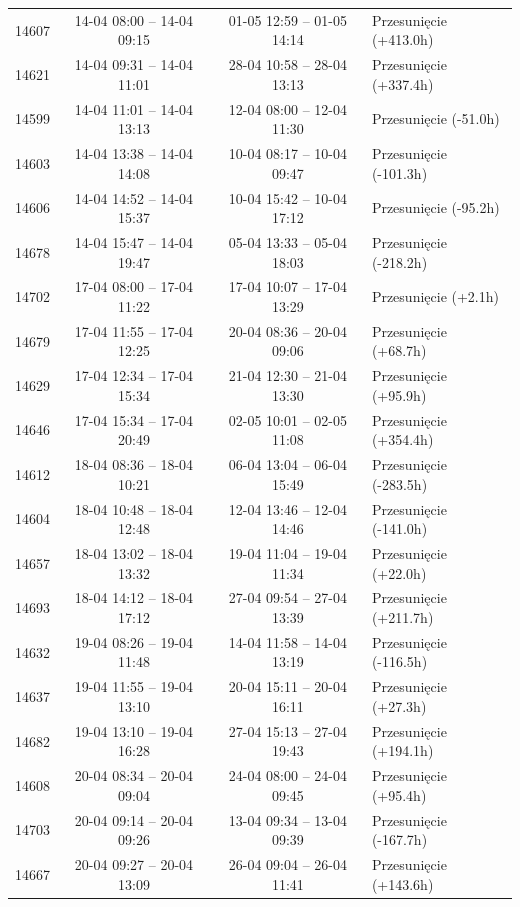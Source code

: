 \begin{table}[htbp]
\begin{tabular}{|r|c|c|l|}
14607 & 14-04 08:00 -- 14-04 09:15 & 01-05 12:59 -- 01-05 14:14 & Przesunięcie (+413.0h) \\ 
14621 & 14-04 09:31 -- 14-04 11:01 & 28-04 10:58 -- 28-04 13:13 & Przesunięcie (+337.4h) \\ 
14599 & 14-04 11:01 -- 14-04 13:13 & 12-04 08:00 -- 12-04 11:30 & Przesunięcie (-51.0h) \\ 
14603 & 14-04 13:38 -- 14-04 14:08 & 10-04 08:17 -- 10-04 09:47 & Przesunięcie (-101.3h) \\ 
14606 & 14-04 14:52 -- 14-04 15:37 & 10-04 15:42 -- 10-04 17:12 & Przesunięcie (-95.2h) \\ 
14678 & 14-04 15:47 -- 14-04 19:47 & 05-04 13:33 -- 05-04 18:03 & Przesunięcie (-218.2h) \\ 
14702 & 17-04 08:00 -- 17-04 11:22 & 17-04 10:07 -- 17-04 13:29 & Przesunięcie (+2.1h) \\ 
14679 & 17-04 11:55 -- 17-04 12:25 & 20-04 08:36 -- 20-04 09:06 & Przesunięcie (+68.7h) \\ 
14629 & 17-04 12:34 -- 17-04 15:34 & 21-04 12:30 -- 21-04 13:30 & Przesunięcie (+95.9h) \\ 
14646 & 17-04 15:34 -- 17-04 20:49 & 02-05 10:01 -- 02-05 11:08 & Przesunięcie (+354.4h) \\ 
14612 & 18-04 08:36 -- 18-04 10:21 & 06-04 13:04 -- 06-04 15:49 & Przesunięcie (-283.5h) \\ 
14604 & 18-04 10:48 -- 18-04 12:48 & 12-04 13:46 -- 12-04 14:46 & Przesunięcie (-141.0h) \\ 
14657 & 18-04 13:02 -- 18-04 13:32 & 19-04 11:04 -- 19-04 11:34 & Przesunięcie (+22.0h) \\ 
14693 & 18-04 14:12 -- 18-04 17:12 & 27-04 09:54 -- 27-04 13:39 & Przesunięcie (+211.7h) \\ 
14632 & 19-04 08:26 -- 19-04 11:48 & 14-04 11:58 -- 14-04 13:19 & Przesunięcie (-116.5h) \\ 
14637 & 19-04 11:55 -- 19-04 13:10 & 20-04 15:11 -- 20-04 16:11 & Przesunięcie (+27.3h) \\ 
14682 & 19-04 13:10 -- 19-04 16:28 & 27-04 15:13 -- 27-04 19:43 & Przesunięcie (+194.1h) \\ 
14608 & 20-04 08:34 -- 20-04 09:04 & 24-04 08:00 -- 24-04 09:45 & Przesunięcie (+95.4h) \\ 
14703 & 20-04 09:14 -- 20-04 09:26 & 13-04 09:34 -- 13-04 09:39 & Przesunięcie (-167.7h) \\ 
14667 & 20-04 09:27 -- 20-04 13:09 & 26-04 09:04 -- 26-04 11:41 & Przesunięcie (+143.6h) \\ 

\end{tabular}
\end{table}
